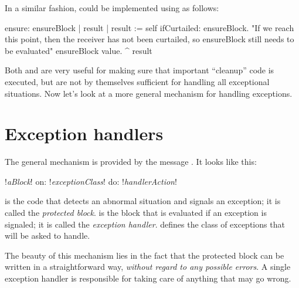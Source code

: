 \documentclass[a4paper,10pt,twoside]{book}
\begin{document}
In a similar fashion,  could be implemented using  as follows:

\begin{code}{}
ensure: ensureBlock
	| result |
	result := self ifCurtailed: ensureBlock.
	"If we reach this point, then the receiver has not been curtailed,
	so ensureBlock still needs to be evaluated"
	ensureBlock value.
	^ result
\end{code}

Both  and  are very useful for making sure that important ``cleanup'' code is executed, but are not by themselves sufficient for handling all exceptional situations.
Now let's look at a more general mechanism for handling exceptions.

\section{Exception handlers}

The general mechanism is provided by the message . It looks like this:
\begin{code}{}
!\emph{aBlock}! on: !\emph{exceptionClass}! do: !\emph{handlerAction}!
\end{code}
\noindent
{} is the code that detects an abnormal situation and signals an exception; it is called the \emph{protected block}.   
 is the block that is evaluated if an exception is signaled; it is called the \emph{exception handler}.
 defines the class of exceptions that  will be asked to handle.



The beauty of this mechanism lies in the fact that the protected block can be written in  a straightforward way, \emph{without regard to any possible errors}. A single exception handler is responsible for taking care of anything that may go wrong.
\end{document}

